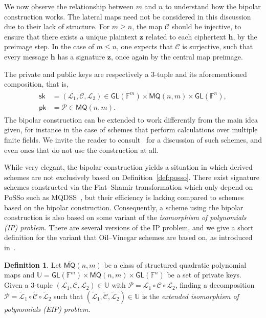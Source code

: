 \documentclass[12pt, a4paper, oneside]{memoir}
\theoremstyle{definition}
\newtheorem{definition}[theorem]{Definition}
\begin{document}
We now observe the relationship between $m$ and $n$ to understand how the bipolar construction works. The lateral maps need not be considered in this discussion due to their lack of structure. For $m \geq n$, the map $\mathcal{C}$ should be injective, to ensure that there exists a unique plaintext $\mathbf{z}$ related to each ciphertext $\mathbf{h}$, by the preimage step. In the case of $m \leq n$, one expects that $\mathcal{C}$ is surjective, such that every message $\mathbf{h}$ has a signature $\mathbf{z}$, once again by the central map preimage.

The private and public keys are respectively a $3$-tuple and its aforementioned composition, that is,
\begin{align}
  \begin{split}
    \mathsf{sk} &= (\mathcal{L}_{1}, \mathcal{C}, \mathcal{L}_{2}) 
      \in \mathsf{GL}(\mathbb{F}^{m}) \times \mathsf{MQ}(n, m) \times \mathsf{GL}(\mathbb{F}^{n}), \\
    \mathsf{pk} &= \mathcal{P} \in \mathsf{MQ}(n, m).
  \end{split}
\end{align}
The bipolar construction can be extended to work differently from the main idea given, for instance in the case of schemes that perform calculations over multiple finite fields. We invite the reader to consult~\cite[Section 2.2]{Petzoldt:201307} for a discussion of such schemes, and even ones that do not use the construction at all.

While very elegant, the bipolar construction yields a situation in which derived schemes are not exclusively based on Definition~\ref{def:posso}. There exist signature schemes constructed via the Fiat--Shamir transformation which only depend on \textsf{PoSSo} such as MQDSS~\cite{Chen:201612}, but their efficiency is lacking compared to schemes based on the bipolar construction. Consequently, a scheme using the bipolar construction is also based on some variant of the \emph{isomorphism of polynomials (IP) problem}. There are several versions of the IP problem, and we give a short definition for the variant that Oil--Vinegar schemes are based on, as introduced in~\cite{Ding:200806}.

\begin{definition}\label{def:eip}
  Let $\overline{\mathsf{MQ}}(n, m)$ be a class of structured quadratic polynomial maps and $\mathbb{U} = \mathsf{GL}(\mathbb{F}^{m}) \times \overline{\mathsf{MQ}}(n, m) \times \mathsf{GL}(\mathbb{F}^{n})$ be a set of private keys. Given a $3$-tuple $(\mathcal{L}_{1}, \mathcal{C}, \mathcal{L}_{2}) \in \mathbb{U}$ with $\mathcal{P} = \mathcal{L}_{1} \circ \mathcal{C} \circ \mathcal{L}_{2}$, finding a decomposition $\mathcal{P} = \widetilde{\mathcal{L}}_{1} \circ \widetilde{\mathcal{C}} \circ \widetilde{\mathcal{L}}_{2}$ such that $(\widetilde{\mathcal{L}}_{1}, \widetilde{\mathcal{C}}, \widetilde{\mathcal{L}}_{2}) \in \mathbb{U}$ is the \emph{extended isomorphism of polynomials (EIP) problem}.
\end{definition}
\end{document}
